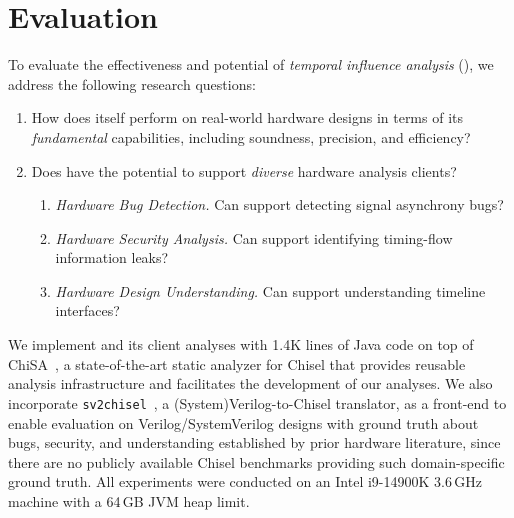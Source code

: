 \section{Evaluation}

To evaluate the effectiveness and potential of \emph{temporal influence analysis} (\tia), we address the following research questions:
\begin{enumerate}[label=\textbf{RQ\arabic*.}, leftmargin=*, align=left]
    \item How does \tia itself perform on real-world hardware designs in terms of its \emph{fundamental} capabilities, including soundness, precision, and efficiency?
    \item Does \tia have the potential to support \emph{diverse} hardware analysis clients?
    \begin{enumerate}[label=\textbf{RQ2-\arabic*.}, leftmargin=1ex, align=left]
        \item \emph{Hardware Bug Detection.}
        Can \tia support detecting signal asynchrony bugs?
        \item \emph{Hardware Security Analysis.}
        Can \tia support identifying timing-flow information leaks?
        \item \emph{Hardware Design Understanding.}
        Can \tia support understanding timeline interfaces?
    \end{enumerate}
\end{enumerate}
We implement \tia and its client analyses with 1.4K lines of Java code on top of ChiSA~\cite{cui_chisa_2026}, a state-of-the-art static analyzer for Chisel that provides reusable analysis infrastructure and facilitates the development of our analyses.
We also incorporate \texttt{sv2chisel}~\cite{bruant_systemverilog_2020}, a (System)Verilog-to-Chisel translator, as a front-end to enable evaluation on Verilog/SystemVerilog designs with ground truth about bugs, security, and understanding established by prior hardware literature, since there are no publicly available Chisel benchmarks providing such domain-specific ground truth.
All experiments were conducted on an Intel i9-14900K 3.6\,GHz machine with a 64\,GB JVM heap limit.




